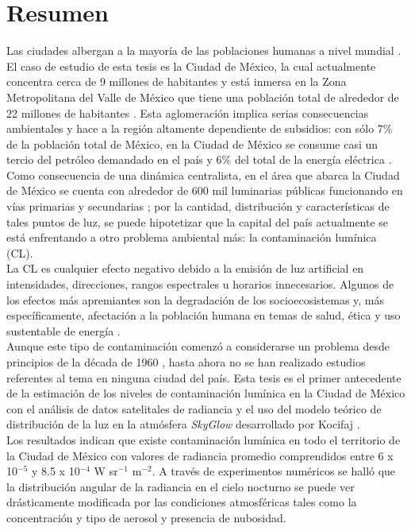 \chapter{Resumen}

Las ciudades albergan a la mayoría de las poblaciones humanas a nivel mundial \citep{Zari2018}. El caso de estudio de esta tesis es la Ciudad de México, la cual actualmente concentra cerca de 9 millones de habitantes \citep{INEGI2015} y está inmersa en la Zona Metropolitana del Valle de México que tiene una población total de alrededor de 22 millones de habitantes \citep{OCDE2015}. Esta aglomeración implica serias consecuencias ambientales y hace a la región altamente dependiente de subsidios: con sólo 7\% de la población total de México, en la Ciudad de México se consume casi un tercio del petróleo demandado en el país y 6\% del total de la energía eléctrica \citep{SENER2013}.\\

Como consecuencia de una dinámica centralista, en el área que abarca la Ciudad de México se cuenta con alrededor de 600 mil luminarias públicas funcionando en vías primarias y secundarias \citep{INFO2019}; por la cantidad, distribución y características de tales puntos de luz, se puede hipotetizar que la capital del país actualmente se está enfrentando a otro problema ambiental más: la contaminación lumínica (CL).\\

La CL es cualquier efecto negativo debido a la emisión de luz artificial en intensidades, direcciones, rangos espectrales u horarios innecesarios. Algunos de los efectos más apremiantes son la degradación de los socioecosistemas y, más específicamente, afectación a la población humana en temas de salud, ética y uso sustentable de energía \citep{AtlasREPSA, LibroCL, Stone2017}.\\

Aunque este tipo de contaminación comenzó a considerarse un problema desde principios de la década de 1960 \citep{LibroCL}, hasta ahora no se han realizado estudios referentes al tema en ninguna ciudad del país. Esta tesis es el primer antecedente de la estimación de los niveles de contaminación lumínica en la Ciudad de México con el análisis de datos satelitales de radiancia y el uso del modelo teórico de distribución de la luz en la atmósfera \textit{SkyGlow} desarrollado por Kocifaj \citep{Kocifaj2007}.\\

Los resultados indican que existe contaminación lumínica en todo el territorio de la Ciudad de México con valores de radiancia promedio comprendidos entre 6 x 10$^{-5}$ y 8.5 x 10$^{-4}$ W sr$^{-1}$ m$^{-2}$. A través de experimentos numéricos se halló que la distribución angular de la radiancia en el cielo nocturno se puede ver drásticamente modificada por las condiciones atmosféricas tales como la concentración y tipo de aerosol y presencia de nubosidad.\\

